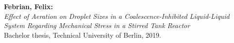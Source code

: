 \newpage


\thispagestyle{empty}                   %

\vspace*{\fill}

\footnotesize
\noindent
\textbf{Febrian, Felix:} \\
\textit{Effect of Aeration on Droplet Sizes in a Coalescence-Inhibited Liquid-Liquid System Regarding Mechanical Stress in a Stirred Tank Reactor} \\
Bachelor thesis, Technical University of Berlin, 2019.
\restoregeometry
\normalsize

